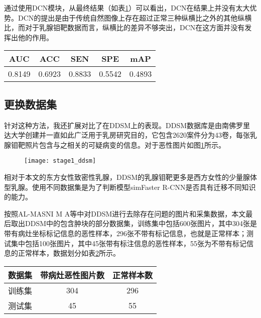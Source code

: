 通过使用DCN模块，从最终结果（如表\ref{tab:1_stage_dcn_pred_result}）可以看出，DCN在结果上并没有太大优势。DCN的提出是由于传统自然图像上存在超过正常三种纵横比之外的其他纵横比，而对于乳腺钼靶数据而言，纵横比的差异不够突出，DCN在这方面并没有发挥出他的作用。
\begin{table}[!htbp]
    \label{tab:1_stage_dcn_pred_result}
    \centering
    \footnotesize%
    \setlength{\tabcolsep}{4pt}%
    \renewcommand{\arraystretch}{1.2}%
    \begin{tabular}{ccccc}
        \hline
        AUC& ACC &SEN &SPE &mAP \\
        \hline
        0.8149 &0.6923 &0.8833  &0.5542 &0.4893 \\
        \hline
    \end{tabular}
\end{table}

\subsection{更换数据集}
针对这种方法，我还扩展对比了在DDSM上的表现。DDSM数据库是由南佛罗里达大学创建并一直如此广泛用于乳房研究目的，它包含2620案件分为43卷，每张乳腺钼靶照片包含与之相关的可疑病变的信息。对于恶性图片如图\ref{fig:stage1_ddsm}所示。
\begin{figure}[!htbp]
    \centering
    \texttt{[image: stage1\_ddsm]}
    \label{fig:stage1_ddsm}
\end{figure}

相对于本文的东方女性致密性乳腺，DDSM的乳腺钼靶更多是西方女性的少量腺体型乳腺。使用不同数据集是为了判断模型simFaster R-CNN是否具有迁移不同知识的能力。

按照AL-MASNI M A等\cite{al2017detection}中对DDSM进行去除存在问题的图片和采集数据，本文最后取出DDSM中的包含肿块的部分数据集，训练集中包括600张图片，其中304张是带有病灶坐标标记信息的恶性样本，296张不带有标记信息，也就是正常样本；测试集中包括100张图片，其中45张带有标注信息的恶性样本，55张为不带有标记信息的正常样本，数据划分如表\ref{tab:data_set_split for ddsm}所示。
\begin{table}[!htbp]
    \label{tab:data_set_split for ddsm}
    \centering
    \footnotesize%
    \setlength{\tabcolsep}{4pt}%
    \renewcommand{\arraystretch}{1.2}%
    \begin{tabular}{ccc}
        \hline
        数据集& 带病灶恶性图片数& 正常样本数\\
        \hline
        训练集& 304 &296\\
		\hline
		测试集& 45 &55\\
        \hline
    \end{tabular}
\end{table}

